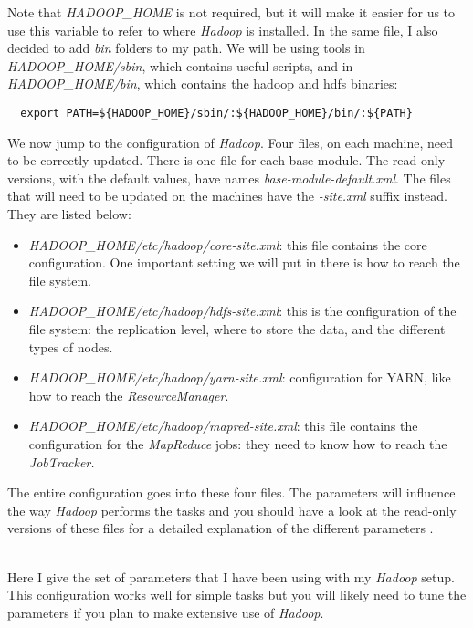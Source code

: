 \documentclass[a4paper, 12pt]{article}
\begin{document}
Note that \textit{HADOOP\_HOME} is not required, but it will make it easier for us to use this variable to refer to where \textit{Hadoop} is installed.  In the same file, I also decided to add \textit{bin} folders to my path. We will be using tools in \textit{HADOOP\_HOME/sbin}, which contains useful scripts, and in \textit{HADOOP\_HOME/bin}, which contains the hadoop and hdfs binaries:

\begin{verbatim}
  export PATH=${HADOOP_HOME}/sbin/:${HADOOP_HOME}/bin/:${PATH}
\end{verbatim}

We now jump to the configuration of \textit{Hadoop}. Four files, on each machine, need to be correctly updated. There is one file for each base module. The read-only versions, with the default values, have names \textit{base-module-default.xml}. The files that will need to be updated on the machines have the \textit{-site.xml} suffix instead. They are listed below:
\begin{itemize}
  \item \textit{HADOOP\_HOME/etc/hadoop/core-site.xml}: this file contains the core configuration. One important setting we will put in there is how to reach the file system.
  \item \textit{HADOOP\_HOME/etc/hadoop/hdfs-site.xml}: this is the configuration of the file system: the replication level, where to store the data, and the different types of nodes.
  \item \textit{HADOOP\_HOME/etc/hadoop/yarn-site.xml}: configuration for YARN, like how to reach the \textit{ResourceManager}.
  \item \textit{HADOOP\_HOME/etc/hadoop/mapred-site.xml}: this file contains the configuration for the \textit{MapReduce} jobs: they need to know how to reach the \textit{JobTracker.}
\end{itemize}

The entire configuration goes into these four files. The parameters will influence the way \textit{Hadoop} performs the tasks and you should have a look at the read-only versions of these files for a detailed explanation of the different parameters \cite{hadoop_core_default} \cite{hadoop_hdfs_default} \cite{hadoop_yarn_default} \cite{hadoop_mapred_default}.

~\\
Here I give the set of parameters that I have been using with my \textit{Hadoop} setup. This configuration works well for simple tasks but you will likely need to tune the parameters if you plan to make extensive use of \textit{Hadoop}.
\end{document}
